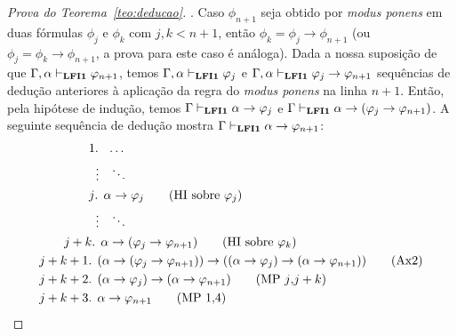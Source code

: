 \begin{proof}[Prova do Teorema~\ref{teo:deducao}]
        . Caso $\phi_{n + 1}$ seja obtido por \textit{modus ponens} em duas fórmulas $\phi_{j}$ e $\phi_{k}$ com $j, k < n + 1$, então $\phi_{k} = \phi_{j} \to \phi_{n + 1}$ (ou $\phi_{j} = \phi_{k} \to \phi_{n + 1}$, a prova para este caso é análoga). Dada a nossa suposição de que $\Gamma, \alpha \vdash_{\textbf{LFI1}{}} \varphi_{n + 1}$, temos $\Gamma, \alpha \vdash_{\textbf{LFI1}{}} \varphi_{j}$ e $\Gamma, \alpha \vdash_{\textbf{LFI1}{}} \varphi_{j} \to \varphi_{n + 1}$ sequências de dedução anteriores à aplicação da regra do \textit{modus ponens} na linha $n + 1$. Então, pela hipótese de indução, temos $\Gamma \vdash_{\textbf{LFI1}{}} \alpha \to \varphi_{j}$ e $\Gamma \vdash_{\textbf{LFI1}{}} \alpha \to (\varphi_{j} \to \varphi_{n + 1})$. A seguinte sequência de dedução mostra $\Gamma \vdash_{\textbf{LFI1}{}} \alpha \to \varphi_{n + 1}$:
        \begin{align*}
            & \text{~~~~~~~~~~~~1. } \; \ldots\\
            & ~~~~~~~~~~~~\; \; \vdots \; \; \;\ddots\\
            & \text{~~~~~~~~~~~~$j$. } \alpha \to \phi_{j} \tag{HI sobre $\phi_{j}$}\\
            & ~~~~~~~~~~~~\; \; \vdots \; \; \;\ddots\\
            & \text{~~~~~~$j + k$. } \alpha \to (\phi_{j} \to \phi_{n + 1}) \tag{HI sobre $\phi_{k}$}\\
            & \text{$j + k + 1$. } (\alpha \to (\phi_{j} \to \phi_{n + 1})) \to ((\alpha \to \phi_{j}) \to (\alpha \to \phi_{n + 1})) \tag{Ax2}\\
            & \text{$j + k + 2$. } (\alpha \to \phi_{j}) \to (\alpha \to \phi_{n + 1}) \tag{MP $j$,$j + k$}\\
            & \text{$j + k + 3$. } \alpha \to \phi_{n + 1} \tag{MP 1,4}
        \end{align*}
    \end{proof}
